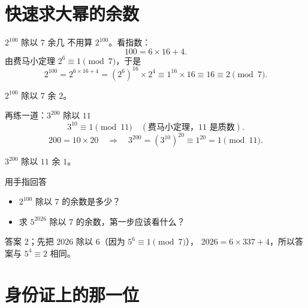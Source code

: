 \documentclass[10pt]{beamer}
\begin{document}
\section{快速求大幂的余数}

\begin{frame}{\(2^{100}\) 除以 \(7\) 余几}
  不用算 \(2^{100}\)。看指数：
  \[
    100=6\times16+4 .
  \]
  \pause
  由费马小定理 \(2^{6}\equiv1\pmod 7\)，于是
  \[
    2^{100}=2^{6\times16+4}=(2^{6})^{16}\times2^{4}\equiv1^{16}\times16\equiv16\equiv2 \pmod 7 .
  \]
  \pause
  \begin{center}
    {\large \(2^{100}\) 除以 \(7\) 余 \(2\)。}
  \end{center}
\end{frame}

\begin{frame}{再练一道：\(3^{200}\) 除以 \(11\)}
  \[
    3^{10}\equiv1 \pmod{11}\quad(\text{费马小定理，}11\text{ 是质数}) .
  \]
  \pause
  \[
    200=10\times20 \quad\Longrightarrow\quad
    3^{200}=(3^{10})^{20}\equiv1^{20}=1 \pmod{11} .
  \]
  \pause
  \begin{center}
    {\large \(3^{200}\) 除以 \(11\) 余 \(1\)。}
  \end{center}
\end{frame}

\begin{frame}{用手指回答}
  \begin{itemize}
    \item \(2^{100}\) 除以 \(7\) 的余数是多少？
    \item 求 \(5^{2026}\) 除以 \(7\) 的余数，第一步应该看什么？
  \end{itemize}
  \pause
  \begin{block}{答案}
    \(2\)；\quad 先把 \(2026\) 除以 \(6\)（因为 \(5^6\equiv1\pmod 7\)），
    \(2026=6\times337+4\)，所以答案与 \(5^4\equiv2\) 相同。
  \end{block}
\end{frame}

\section{身份证上的那一位}
\end{document}
